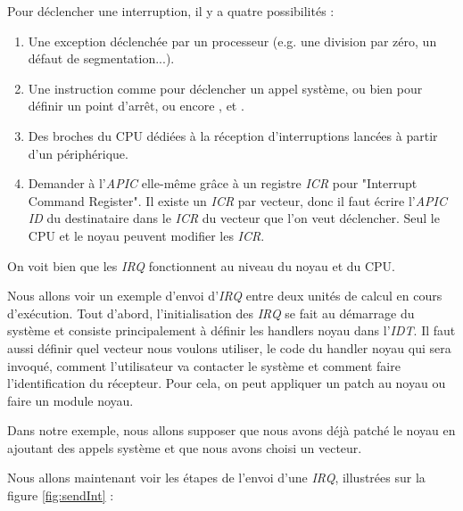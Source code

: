 Pour déclencher une interruption, il y a quatre possibilités :

\begin{enumerate}
  \item Une exception déclenchée par un processeur (e.g. une division par zéro, un défaut de segmentation...).
  \item Une instruction comme  pour déclencher un appel système, ou bien  pour définir un point d'arrêt, ou encore ,  et .
  \item Des broches du CPU dédiées à la réception d'interruptions lancées à partir d'un périphérique.
  \item Demander à l'\emph{APIC} elle-même grâce à un registre \emph{ICR} pour "Interrupt Command Register".
  Il existe un \emph{ICR} par vecteur, donc il faut écrire l'\emph{APIC ID} du destinataire dans le \emph{ICR} du vecteur que l'on veut déclencher.
  Seul le CPU et le noyau peuvent modifier les \emph{ICR}. %
\end{enumerate}

On voit bien que les \emph{IRQ} fonctionnent au niveau du noyau et du CPU.

Nous allons voir un exemple d'envoi d'\emph{IRQ} entre deux unités de calcul en cours d'exécution.
Tout d'abord, l'initialisation des \emph{IRQ} se fait au démarrage du système et consiste principalement à définir les handlers noyau dans l'\emph{IDT}.
Il faut aussi définir quel vecteur nous voulons utiliser, le code du handler noyau qui sera invoqué,
comment l'utilisateur va contacter le système et comment faire l'identification du récepteur.
Pour cela, on peut appliquer un patch au noyau ou faire un module noyau.

Dans notre exemple, nous allons supposer que nous avons déjà patché le noyau en ajoutant des appels système et que nous avons choisi un vecteur.

Nous allons maintenant voir les étapes de l'envoi d'une \emph{IRQ}, illustrées sur la figure \ref{fig:sendInt} :

